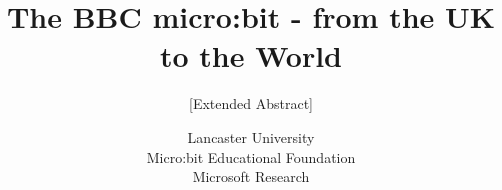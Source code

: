 \documentclass{research4cacm}
\begin{document}
%

\title{The BBC micro:bit - from the UK to the World
%
}
\subtitle{[Extended Abstract]
}
%
%
%
%
%
%
\author{
%
%
\alignauthor Lancaster University \\
\alignauthor Micro:bit Educational Foundation \\
\alignauthor Microsoft Research \\
}
\end{document}
